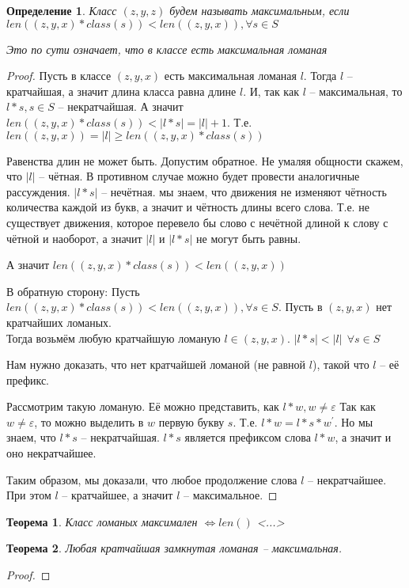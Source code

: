 \documentclass[12pt,a4paper, flushleft]{article}
\newtheorem{Def}{Определение}[section]
\newtheorem{Th}{Теорема}[section]
\newcommand{\p}[1]{#1^{\prime}}
\begin{document}
\begin{Def}
	Класс $(z, y, z)$ будем называть максимальным, если $len((z, y, x)*class(s))<len((z, y, x)) , \forall s\in S$
	
	Это по сути означает, что в классе есть максимальная ломаная
\end{Def}
\begin{proof}
	Пусть в классе $(z, y, x)$ есть максимальная ломаная $l$. Тогда $l$ -- кратчайшая, а значит длина класса равна длине $l$. И, так как $l$ -- максимальная, то $l * s, s\in S$ -- некратчайшая. А значит $len((z, y, x)*class(s)) < |l*s| = |l|+1$. Т.е. $len((z, y, x)) = |l|\geqslant  len((z, y, x)*class(s))$
	
	Равенства длин не может быть. Допустим обратное. Не умаляя общности скажем, что $|l|$ -- чётная. В противном случае можно будет провести аналогичные рассуждения. $|l * s|$ -- нечётная. мы знаем, что движения не изменяют чётность количества каждой из букв, а значит и чётность длины всего слова. Т.е. не существует движения, которое перевело бы слово с нечётной длиной к слову с чётной и наоборот, а значит $|l|$ и $|l*s|$ не могут быть равны.
	
	А значит $len((z, y, x)*class(s))<len((z, y, x))$
	
	В обратную сторону: Пусть $len((z, y, x)*class(s))<len((z, y, x)) , \forall s\in S$. Пусть в $(z, y, x)$ нет кратчайших ломаных. \\Тогда возьмём любую кратчайшую ломаную $l\in (z, y, x)$. $|l*s| < |l|~~ \forall s\in S$
	
	Нам нужно доказать, что нет кратчайшей ломаной (не равной $l$), такой что $l$ -- её префикс.
	
	Рассмотрим такую ломаную. Её можно представить, как $l * w, w\neq \varepsilon$ Так как $w\neq \varepsilon$, то можно выделить в $w$ первую букву $s$. Т.е. $l*w = l*s*\p w$. Но мы знаем, что $l*s$ -- некратчайшая. $l*s$ является префиксом слова $l*w$, а значит и оно некратчайшее. 
	
	Таким образом, мы доказали, что любое продолжение слова $l$ -- некратчайшее. При этом $l$ -- кратчайшее, а значит $l$ -- максимальное.
	
	
\end{proof}	

\begin{Th}
	Класс ломаных максимален $\Longleftrightarrow len()$  <...>
\end{Th}

\begin{Th}
	Любая кратчайшая замкнутая ломаная -- максимальная.
\end{Th}
\begin{proof}
	
\end{proof}
\end{document}
